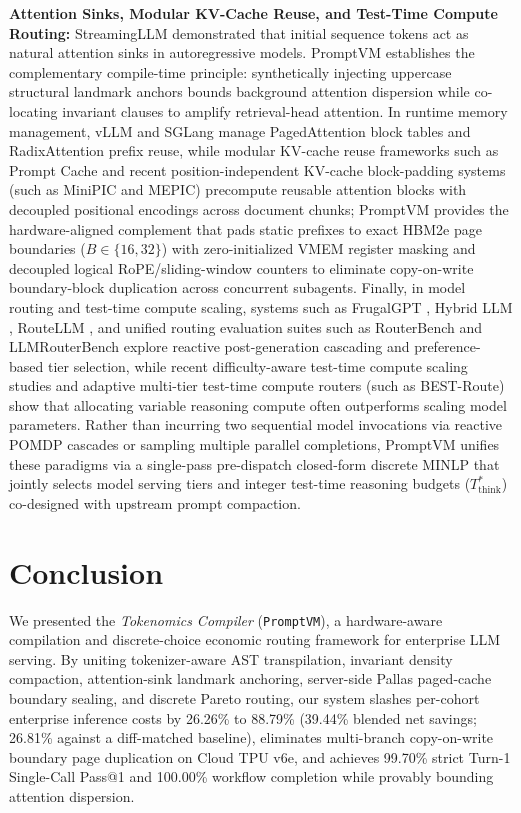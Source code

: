 \documentclass[conference,10pt]{IEEEtran}
\begin{document}
\textbf{Attention Sinks, Modular KV-Cache Reuse, and Test-Time Compute Routing:} StreamingLLM \cite{xiao2023streamingllm} demonstrated that initial sequence tokens act as natural attention sinks in autoregressive models. PromptVM establishes the complementary compile-time principle: synthetically injecting uppercase structural landmark anchors bounds background attention dispersion while co-locating invariant clauses to amplify retrieval-head attention. In runtime memory management, vLLM \cite{kwon2023vllm} and SGLang \cite{zheng2024sglang} manage PagedAttention block tables and RadixAttention prefix reuse, while modular KV-cache reuse frameworks such as Prompt Cache \cite{gim2024promptcache} and recent position-independent KV-cache block-padding systems (such as MiniPIC and MEPIC) precompute reusable attention blocks with decoupled positional encodings across document chunks; PromptVM provides the hardware-aligned complement that pads static prefixes to exact HBM2e page boundaries ($B \in \{16, 32\}$) with zero-initialized VMEM register masking and decoupled logical RoPE/sliding-window counters to eliminate copy-on-write boundary-block duplication across concurrent subagents. Finally, in model routing and test-time compute scaling, systems such as FrugalGPT \cite{frugalgpt2023}, Hybrid LLM \cite{ding2024hybridllm}, RouteLLM \cite{ong2025routellm}, and unified routing evaluation suites such as RouterBench \cite{hu2024routerbench} and LLMRouterBench explore reactive post-generation cascading and preference-based tier selection, while recent difficulty-aware test-time compute scaling studies \cite{snell2024scaling} and adaptive multi-tier test-time compute routers (such as BEST-Route) show that allocating variable reasoning compute often outperforms scaling model parameters. Rather than incurring two sequential model invocations via reactive POMDP cascades or sampling multiple parallel completions, PromptVM unifies these paradigms via a single-pass pre-dispatch closed-form discrete MINLP that jointly selects model serving tiers and integer test-time reasoning budgets ($T_{\text{think}}^*$) co-designed with upstream prompt compaction.

\section{Conclusion}
\label{sec:conclusion}
We presented the \textit{Tokenomics Compiler} (\texttt{PromptVM}), a hardware-aware compilation and discrete-choice economic routing framework for enterprise LLM serving. By uniting tokenizer-aware AST transpilation, invariant density compaction, attention-sink landmark anchoring, server-side Pallas paged-cache boundary sealing, and discrete Pareto routing, our system slashes per-cohort enterprise inference costs by 26.26\% to 88.79\% (39.44\% blended net savings; 26.81\% against a diff-matched baseline), eliminates multi-branch copy-on-write boundary page duplication on Cloud TPU v6e, and achieves 99.70\% strict Turn-1 Single-Call Pass@1 and 100.00\% workflow completion while provably bounding attention dispersion.
\end{document}
